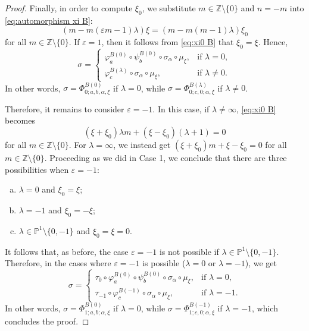 \documentclass[11pt, svgnames]{amsart}
\newcommand{\ZZ}{\mathbb{Z}}
\newcommand{\PP}{\mathbb{P}}
\newcommand{\nonzero}{\setminus \{0\}}
\theoremstyle{definition}
\begin{document}
\begin{proof}
    Finally, in order to compute $\xi_0$, we substitute $m \in \ZZ \nonzero$ and $n = -m$ into \eqref{eq:automorphism xi B}:
    \begin{equation}\label{eq:xi0 B}
        (m - m(\varepsilon m - 1)\lambda)\xi = (m - m(m - 1)\lambda)\xi_0
    \end{equation}
    for all $m \in \ZZ \nonzero$. If $\varepsilon = 1$, then it follows from \eqref{eq:xi0 B} that $\xi_0 = \xi$. Hence,
    $$\sigma = \begin{cases}
        \varphi_a^{B(0)} \circ \psi_b^{B(0)} \circ \sigma_\alpha \circ \mu_\xi, &\text{if } \lambda = 0, \\
        \varphi_c^{B(\lambda)} \circ \sigma_\alpha \circ \mu_\xi, &\text{if } \lambda \neq 0.
    \end{cases}$$
    In other words, $\sigma = \Phi_{0;a,b,\alpha,\xi}^{B(0)}$ if $\lambda = 0$, while $\sigma = \Phi_{0;c,0;\alpha,\xi}^{B(\lambda)}$ if $\lambda \neq 0$.
    
    Therefore, it remains to consider $\varepsilon = -1$. In this case, if $\lambda \neq \infty$, \eqref{eq:xi0 B} becomes
    $$(\xi + \xi_0)\lambda m + (\xi - \xi_0)(\lambda + 1) = 0$$
    for all $m \in \ZZ \nonzero$. For $\lambda = \infty$, we instead get $(\xi + \xi_0)m + \xi - \xi_0 = 0$ for all $m \in \ZZ \nonzero$. Proceeding as we did in Case 1, we conclude that there are three possibilities when $\varepsilon = -1$:
    \begin{enumerate}[(a)]
        \item $\lambda = 0$ and $\xi_0 = \xi$;
        \item $\lambda = -1$ and $\xi_0 = -\xi$;
        \item $\lambda \in \PP^1 \setminus \{0,-1\}$ and $\xi_0 = \xi = 0$.
    \end{enumerate}
    It follows that, as before, the case $\varepsilon = -1$ is not possible if $\lambda \in \PP^1 \setminus \{0,-1\}$. Therefore, in the cases where $\varepsilon = -1$ is possible ($\lambda = 0$ or $\lambda = -1$), we get
    $$\sigma = \begin{cases}
        \tau_0 \circ \varphi_a^{B(0)} \circ \psi_b^{B(0)} \circ \sigma_\alpha \circ \mu_\xi, &\text{if } \lambda = 0, \\
        \tau_{-1} \circ \varphi_c^{B(-1)} \circ \sigma_\alpha \circ \mu_\xi, &\text{if } \lambda = -1.
    \end{cases}$$
    In other words, $\sigma = \Phi_{1;a,b;\alpha,\xi}^{B(0)}$ if $\lambda = 0$, while $\sigma = \Phi_{1;c,0;\alpha,\xi}^{B(-1)}$ if $\lambda = -1$, which concludes the proof.
\end{proof}
\end{document}
